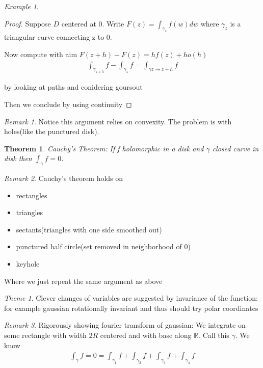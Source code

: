\documentclass[11pt]{article}
\newcommand{\R}{\mathbb{R}}
\newtheorem{theorem}{Theorem}
\theoremstyle{remark}
\newtheorem{remark}{Remark}
\newtheorem{theme}{Theme}
\newtheorem{example}{Example}
\begin{document}
\begin{example}
\begin{proof}
	Suppose $D$ centered at 0. Write $F(z) = \int_{\gamma_z} f(w)dw$ where $\gamma_z$ is a triangular curve connecting z to 0. 

	Now compute with aim $F(z+h) - F(z) = hf(z)+ho(h) $
	\begin{align*}
		\int_{\gamma_{z+h}} f - \int_{\gamma_z}f = \int_{\gamma{z \to z+h}} f 
	\end{align*}

	by looking at paths and conidering goursout

	Then we conclude by using continuity 
\end{proof}

\begin{remark}
	Notice this argument relies on convexity. The problem is with holes(like the punctured disk).
\end{remark}

\begin{theorem}
	\textit{Cauchy's Theorem}: If f holomorphic in a disk and $\gamma$ closed curve in disk then $\int_{\gamma} f = 0$. 
\end{theorem}

\begin{remark}
	Cauchy's theorem holds on 
	\begin{itemize}
		\item rectangles
		\item triangles
		\item sectants(triangles with one side smoothed out)
		\item punctured half circle(set removed in neighborhood of 0)
		\item keyhole
	\end{itemize}

	Where we just repeat the same argument as above
\end{remark}



\begin{theme}
	Clever changes of variables are suggested by invariance of the function: for example gaussian rotationally invariant and thus should try polar coordinates
\end{theme}

\begin{remark}
	Rigorously showing fourier transform of gaussian:
	We integrate on some rectangle with width $2R$ centered and with base along $\R$. Call this $\gamma$. We know
	\begin{align*}
		\int_{\gamma} f = 0 = \int_{\gamma_1} f+ \int_{\gamma_2} f + \int_{\gamma_3} f + \int_{\gamma_4} f
	\end{align*}


\end{remark}
\end{example}
\end{document}
